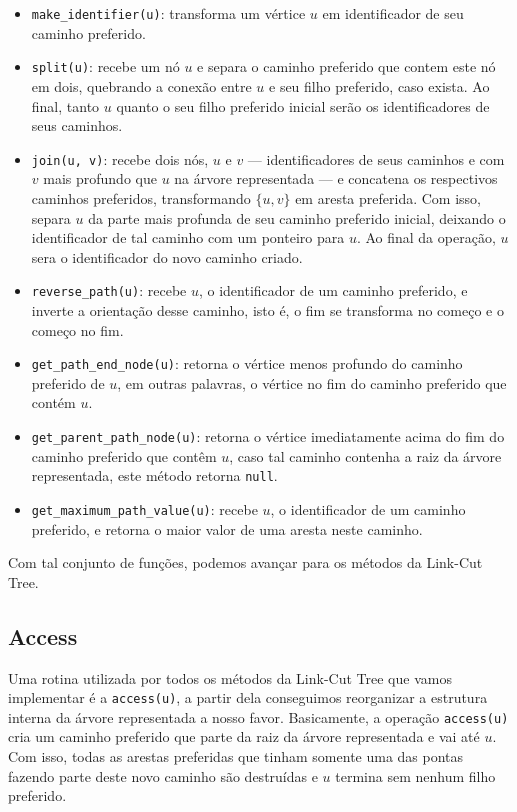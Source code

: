 \begin{itemize}
    \item \texttt{make\_identifier(u)}: transforma um vértice $u$ em identificador de seu caminho preferido.
    \item \texttt{split(u)}: recebe um nó $u$ e separa o caminho preferido que contem este nó em dois, quebrando a conexão entre $u$ e seu filho preferido, caso exista. Ao final, tanto $u$ quanto o seu filho preferido inicial serão os identificadores de seus caminhos.
    \item \texttt{join(u, v)}: recebe dois nós, $u$ e $v$ --- identificadores de seus caminhos e com $v$ mais profundo que $u$ na árvore representada --- e concatena os respectivos caminhos preferidos, transformando $\{u,v\}$ em aresta preferida. Com isso, separa $u$ da parte mais profunda de seu caminho preferido inicial, deixando o identificador de tal caminho com um ponteiro para $u$. Ao final da operação, $u$ sera o identificador do novo caminho criado.
    \item \texttt{reverse\_path(u)}: recebe $u$, o identificador de um caminho preferido, e inverte a orientação desse caminho, isto é, o fim se transforma no começo e o começo no fim.
    \item \texttt{get\_path\_end\_node(u)}: retorna o vértice menos profundo do caminho preferido de $u$, em outras palavras, o vértice no fim do caminho preferido que contém $u$.
    \item \texttt{get\_parent\_path\_node(u)}: retorna o vértice imediatamente acima do fim do caminho preferido que contêm $u$, caso tal caminho contenha a raiz da árvore representada, este método retorna \texttt{null}.
    \item \texttt{get\_maximum\_path\_value(u)}:  recebe $u$, o identificador de um caminho preferido, e retorna o maior valor de uma aresta neste caminho.
\end{itemize}

Com tal conjunto de funções, podemos avançar para os métodos da Link-Cut Tree.

\subsection{Access}
\label{subsection:lct-access}

Uma rotina utilizada por todos os métodos da Link-Cut Tree que vamos implementar é a \texttt{access(u)}, a partir dela conseguimos reorganizar a estrutura interna da árvore representada a nosso favor. Basicamente, a operação \texttt{access(u)} cria um caminho preferido que parte da raiz da árvore representada e vai até $u$. Com isso, todas as arestas preferidas que tinham somente uma das pontas fazendo parte deste novo caminho são destruídas e $u$ termina sem nenhum filho preferido.

